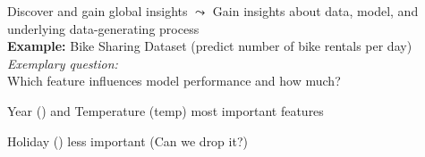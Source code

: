 \documentclass[10pt,compress,t,notes=noshow, xcolor=table]{beamer}
\begin{document}

\begin{framev}[align=top]{Discover and gain global insights}
$\leadsto$ Gain insights about data, model, and underlying data-generating process \\
\spacer[0.25]
\textbf{Example:} Bike Sharing Dataset (predict number of bike rentals per day) \\
\textit{Exemplary question:}\\
Which feature influences model performance and how much?
\begin{itemizeM}
\item Year () and Temperature (temp) most important features
\item Holiday () less important (Can we drop it?)
\end{itemizeM}
\end{framev}



\end{document}

